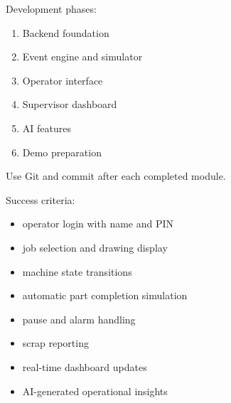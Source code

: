 \documentclass[11pt]{article}
\begin{document}
Development phases:
\begin{enumerate}
\item Backend foundation
\item Event engine and simulator
\item Operator interface
\item Supervisor dashboard
\item AI features
\item Demo preparation
\end{enumerate}

Use Git and commit after each completed module.

Success criteria:
\begin{itemize}
\item operator login with name and PIN
\item job selection and drawing display
\item machine state transitions
\item automatic part completion simulation
\item pause and alarm handling
\item scrap reporting
\item real-time dashboard updates
\item AI-generated operational insights
\end{itemize}
\end{document}
